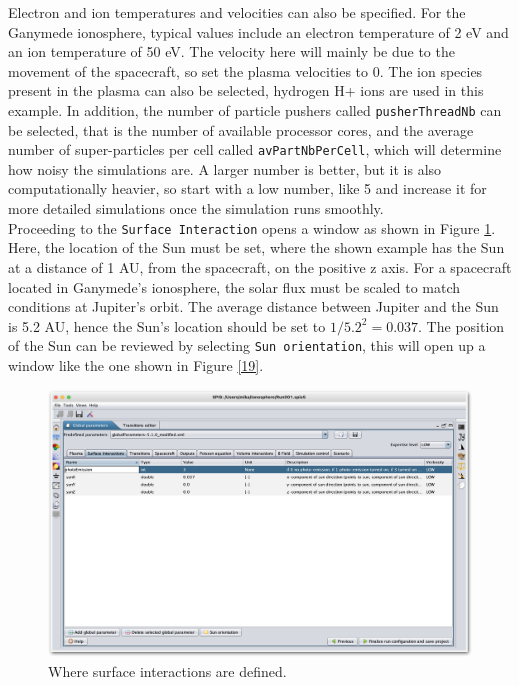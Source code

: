 \documentclass[a4paper, 12pt]{article}
\begin{document}
Electron and ion temperatures and velocities can also be specified. For the Ganymede ionosphere, typical values include an electron temperature of 2 eV and an ion temperature of 50 eV. The velocity here will mainly be due to the movement of the spacecraft, so set the plasma velocities to 0. The ion species present in the plasma can also be selected, hydrogen H+ ions are used in this example. In addition, the number of particle pushers called \verb|pusherThreadNb| can be selected, that is the number of available processor cores, and the average number of super-particles per cell called \verb|avPartNbPerCell|, which will determine how noisy the simulations are. A larger number is better, but it is also computationally heavier, so start with a low number, like 5 and increase it for more detailed simulations once the simulation runs smoothly.\\

Proceeding to the \verb|Surface Interaction| opens a window as shown in Figure \ref{18}. Here, the location of the Sun must be set, where the shown example has the Sun at a distance of 1 AU, from the spacecraft, on the positive z axis. For a spacecraft located in Ganymede's ionosphere, the solar flux must be scaled to match conditions at Jupiter's orbit. The average distance between Jupiter and the Sun is 5.2 AU, hence the Sun's location should be set to $1/5.2^2 = 0.037$. The position of the Sun can be reviewed by selecting \verb|Sun orientation|, this will open up a window like the one shown in Figure \ref{19}. 

\begin{figure}[!ht]
    \centering
    \includegraphics[width=1\textwidth]{fig18.jpg}
    \caption{Where surface interactions are defined.}
    \label{18}
\end{figure}
\end{document}
